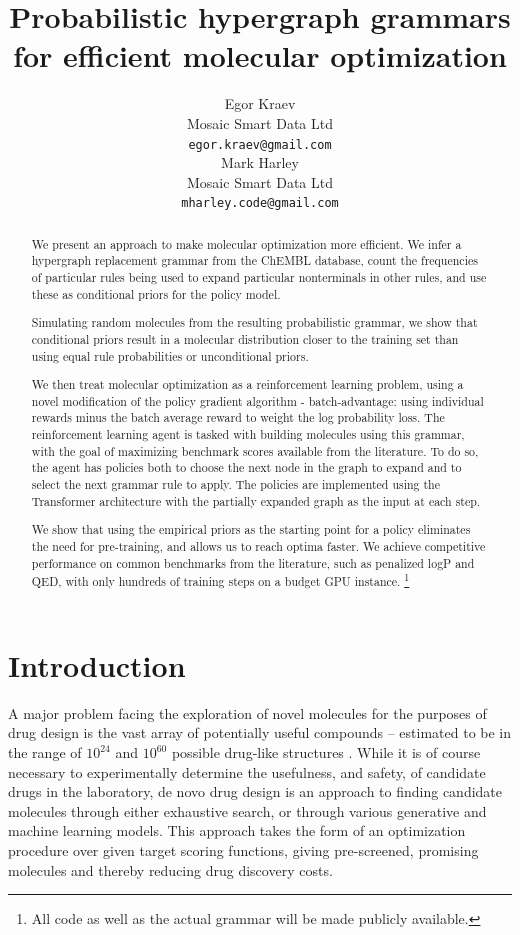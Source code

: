 \documentclass{article}
\title{Probabilistic hypergraph grammars for efficient molecular optimization}
\author{%
  Egor Kraev \\
  Mosaic Smart Data Ltd \\
  \texttt{egor.kraev@gmail.com} \\
  \And
  Mark Harley \\
  Mosaic Smart Data Ltd \\
  \texttt{mharley.code@gmail.com}
}
\begin{document}
\maketitle

\begin{abstract}
We present an approach to make molecular optimization more efficient. We infer a hypergraph replacement grammar from the ChEMBL database, count the frequencies of particular rules being used to expand particular nonterminals in other rules, and use these as conditional priors for the policy model.

Simulating random molecules from the resulting probabilistic grammar, we show that conditional priors result in a molecular distribution closer to the training set than using equal rule probabilities or unconditional priors. 

We then treat molecular optimization as a reinforcement learning problem, using a novel modification of the policy gradient algorithm - batch-advantage:  using individual rewards minus the batch average reward to weight the log probability loss. The reinforcement learning agent is tasked with building molecules using this grammar, with the goal of maximizing benchmark scores available from the literature. To do so, the agent has policies both to choose the next node in the graph to expand and to select the next grammar rule to apply. The policies are implemented using the Transformer architecture with the partially expanded graph as the input at each step.

We show that using the empirical priors as the starting point for a policy eliminates the need for pre-training, and allows us to reach optima faster. We achieve competitive performance on common benchmarks from the literature, such as penalized logP and QED, with only hundreds of training steps on a budget GPU instance. \footnote{All code as well as the actual grammar will be made publicly available.}
\end{abstract}

\section{Introduction}\label{sec:intro}
A major problem facing the exploration of novel molecules for the purposes of drug design is the vast array of potentially useful compounds -- estimated to be in the range of $10^{24}$ and $10^{60}$ possible drug-like structures \cite{walters2019, ruddigkeit2012}. While it is of course necessary to experimentally determine the usefulness, and safety, of candidate drugs in the laboratory, de novo drug design is an approach to finding candidate molecules through either exhaustive search, or through various generative and machine learning models. This approach takes the form of an optimization procedure over given target scoring functions, giving pre-screened, promising molecules and thereby reducing drug discovery costs.
\end{document}
